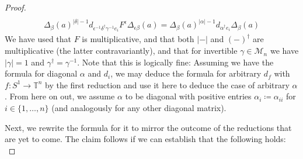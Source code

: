 \documentclass[10pt, a4paper, UKenglish]{article}
\numberwithin{equation}{section}
\newcommand{\cM}{\mathcal{M}}
\newcommand{\sT}{\mathbb{T}}		%
\newcommand{\defas}{\coloneqq}  %
\newcommand{\abs}[1]{\left\vert#1\right\vert}	%
\theoremstyle{plain}
\theoremstyle{definition}
\renewcommand{\to}{\longrightarrow}
\begin{document}
\begin{proof}
\begin{gather}
	\\%
	\Delta_{\beta}(a)^{\abs{\delta}-1} d_{\epsilon^{-1} \delta^\dagger \gamma^{-1} e_i}%
		F^{\epsilon}\Delta_{\epsilon\beta}(a) = %
	\Delta_{\beta}(a)^{\abs{\alpha}-1} d_{\alpha^\dagger e_i} \Delta_{\beta}(a)%
\end{gather}
We have used that $F$ is multiplicative, and that both $\abs{-}$ and $(-)^\dagger$ are multiplicative (the latter contravariantly), and that for invertible $\gamma \in \cM_n$ we have $\abs{\gamma} = 1$ and $\gamma^\dagger = \gamma^{-1}$. Note that this is logically fine: Assuming we have the formula for diagonal $\alpha$ and $d_i$, we may deduce the formula for arbitrary $d_f$ with $f: S^1 \to \sT^n$ by the first reduction and use it here to deduce the case of arbitrary $\alpha$. From here on out, we assume $\alpha$ to be diagonal with positive entries $\alpha_{i} \defas \alpha_{ii}$ for $i \in \{1,\ldots,n\}$ (and analogously for any other diagonal matrix).\\
\begin{comment}	%
\begin{gather*}
	F^{\beta}_{\alpha\beta} d_i \Delta_{\alpha \beta} (a) = %
	F^{\beta}_{\gamma\delta\epsilon\beta} d_i \Delta_{\gamma\delta\epsilon\beta} (a) = %
	F^{\beta}_{\epsilon\beta} F^{\epsilon\beta}_{\delta\epsilon\beta}%
		F^{\delta\epsilon\beta}_{\gamma\delta\epsilon\beta} d_{\gamma (\gamma^{-1} e_i)}%
		\Delta_{\gamma\delta\epsilon\beta} (a) = %
		\\%
	F^{\beta}_{\epsilon\beta} F^{\epsilon\beta}_{\delta\epsilon\beta}%
		 d_{\gamma^{-1} e_i} F^{\delta\epsilon\beta}_{\gamma\delta\epsilon\beta}%
		\Delta_{\gamma\delta\epsilon\beta} (a) = %
	F^{\beta}_{\epsilon\beta} F^{\epsilon\beta}_{\delta\epsilon\beta}%
		 d_{\gamma^{-1} e_i} F^{\delta\epsilon\beta}_{\gamma\delta\epsilon\beta}%
		\Delta_{\gamma\delta\epsilon\beta} (a) =%
		\\%
	F^{\beta}_{\epsilon\beta} F^{\epsilon\beta}_{\delta\epsilon\beta}%
		 d_{\gamma^{-1} e_i} \Delta_{\delta\epsilon\beta} (a) =
	F^{\beta}_{\epsilon\beta} ( \Delta_{\delta\epsilon\beta} (a)^{\abs{\delta}-1}%
		d_{\delta^\dagger \gamma^{-1} e_i} \Delta_{\epsilon\beta}(a) ) = %
\end{gather*}
\end{comment}
Next, we rewrite the formula for it to mirror the outcome of the reductions that are yet to come. The claim follows if we can establish that the following holds:
\begin{equation}\label{eq_Fdw_one_dim_for_diagram}

\end{equation}
\end{proof}
\end{document}
